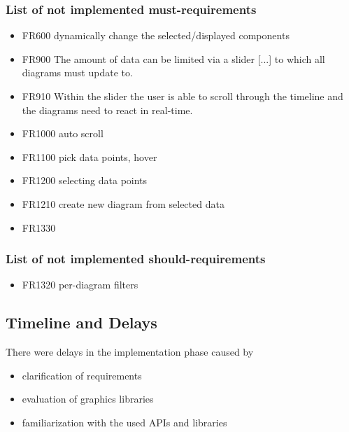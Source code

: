 \documentclass[oneside, english, final]{design}
\begin{document}
\subsubsection{List of not implemented must-requirements}
\begin{itemize}
  \item{FR600 dynamically change the selected/displayed components}
  \item{FR900 The amount of data can be limited via a slider [...]}
        to which all diagrams must update to.
  \item{FR910 Within the slider the user is able to scroll through the timeline and the diagrams need to react in real-time.}
  \item{FR1000 auto scroll}
  \item{FR1100 pick data points, hover}
  \item{FR1200 selecting data points}
  \item{FR1210 create new diagram from selected data}
  \item{FR1330}
\end{itemize}


\subsubsection{List of not implemented should-requirements}
\begin{itemize}
  \item{FR1320 per-diagram filters}
\end{itemize}


\subsection{Timeline and Delays}
There were delays in the implementation phase caused by
\begin{itemize}
  \item{clarification of requirements}
  \item{evaluation of graphics libraries}
  \item{familiarization with the used APIs and libraries}
\end{itemize}
\end{document}
